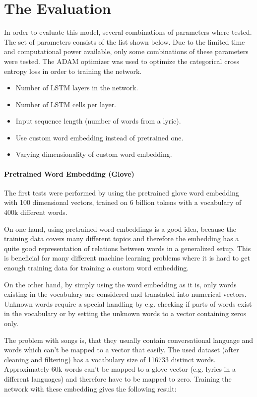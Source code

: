 \documentclass[12pt]{article}
\begin{document}
\section*{The Evaluation}
In order to evaluate this model, several combinations of parameters where tested. The set of parameters consists of the list shown below. Due to the limited time and computational power available, only some combinations of these parameters were tested. The ADAM optimizer was used to optimize the categorical cross entropy loss in order to training the network.

\begin{itemize}
	\item Number of LSTM layers in the network.
	\item Number of LSTM cells per layer.
	\item Input sequence length (number of words from a lyric).
	\item Use custom word embedding instead of pretrained one.
	\item Varying dimensionality of custom word embedding.
\end{itemize}

\paragraph*{Pretrained Word Embedding (Glove)}
The first tests were performed by using the pretrained glove word embedding with 100 dimensional vectors, trained on 6 billion tokens with a vocabulary of 400k different words. 

On one hand, using pretrained word embeddings is a good idea, because the training data covers many different topics and therefore the embedding has a quite good representation of relations between words in a generalized setup. This is beneficial for many different machine learning problems where it is hard to get enough training data for training a custom word embedding.

On the other hand, by simply using the word embedding as it is, only words existing in the vocabulary are considered and translated into numerical vectors. Unknown words require a special handling by e.g. checking if parts of words exist in the vocabulary or by setting the unknown words to a vector containing zeros only.

The problem with songs is, that they usually contain conversational language and words which can't be mapped to a vector that easily. The used dataset (after cleaning and filtering) has a vocabulary size of 116733 distinct words. Approximately 60k words can't be mapped to a glove vector (e.g. lyrics in a different languages) and therefore have to be mapped to zero. Training the network with these embedding gives the following result:
\end{document}
